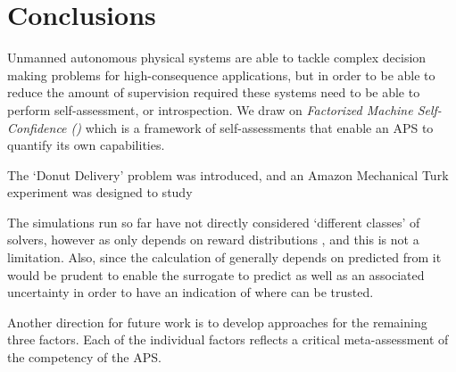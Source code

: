 \section{Conclusions} \label{sec:conclusions}
Unmanned autonomous physical systems are able to tackle complex decision making problems for high-consequence applications, but in order to be able to reduce the amount of supervision required these systems need to be able to perform self-assessment, or introspection. We draw on \emph{Factorized Machine Self-Confidence (\famsec)} which is a framework of self-assessments that enable an APS to quantify its own capabilities.

The `Donut Delivery' problem was introduced, and an Amazon Mechanical Turk experiment was designed to study 

The simulations run so far have not directly considered `different classes' of solvers, however as \xQ{} only depends on reward distributions \rwd{}, and \rwdstar{} this is not a limitation. Also, since the calculation of \xQ{} generally depends on \rwdstar{} predicted from \surrogate{} it would be prudent to enable the surrogate to predict \rwdstar{} as well as an associated uncertainty in order to have an indication of where \surrogate{} can be trusted.

Another direction for future work is to develop approaches for the remaining three \famsec{} factors. Each of the individual factors reflects a critical meta-assessment of the competency of the APS.

